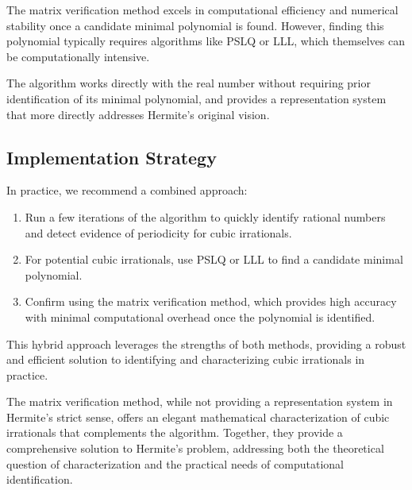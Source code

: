 The matrix verification method excels in computational efficiency and numerical stability once a candidate minimal polynomial is found. However, finding this polynomial typically requires algorithms like PSLQ or LLL, which themselves can be computationally intensive.

The \HAPD{} algorithm works directly with the real number without requiring prior identification of its minimal polynomial, and provides a representation system that more directly addresses Hermite's original vision.

\subsection{Implementation Strategy}

In practice, we recommend a combined approach:
\begin{enumerate}
    \item Run a few iterations of the \HAPD{} algorithm to quickly identify rational numbers and detect evidence of periodicity for cubic irrationals.
    \item For potential cubic irrationals, use PSLQ or LLL to find a candidate minimal polynomial.
    \item Confirm using the matrix verification method, which provides high accuracy with minimal computational overhead once the polynomial is identified.
\end{enumerate}

This hybrid approach leverages the strengths of both methods, providing a robust and efficient solution to identifying and characterizing cubic irrationals in practice.

\begin{remark}
The matrix verification method, while not providing a representation system in Hermite's strict sense, offers an elegant mathematical characterization of cubic irrationals that complements the \HAPD{} algorithm. Together, they provide a comprehensive solution to Hermite's problem, addressing both the theoretical question of characterization and the practical needs of computational identification.
\end{remark}
